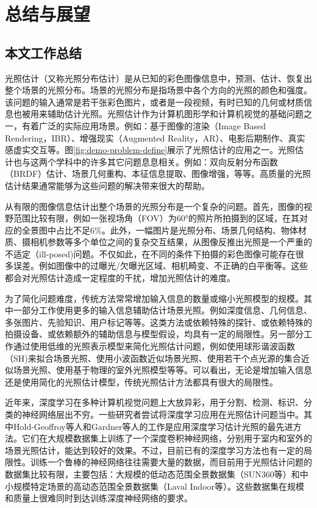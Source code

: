 \chapter{总结与展望}
\section{本文工作总结}
光照估计（又称光照分布估计）是从已知的彩色图像信息中，预测、估计、恢复出整个场景的光照分布。场景的光照分布是指场景中各个方向的光照的颜色和强度。该问题的输入通常是若干张彩色图片，或者是一段视频，有时已知的几何或材质信息也被用来辅助估计光照。光照估计作为计算机图形学和计算机视觉的基础问题之一，有着广泛的实际应用场景。例如：基于图像的渲染（Image Based Rendering，IBR）、增强现实（Augmented Reality，AR）、电影后期制作、真实感虚实交互等。图\ref{fig:demo-problem-define}展示了光照估计的应用之一。光照估计也与这两个学科中的许多其它问题息息相关。例如：双向反射分布函数（BRDF）估计、场景几何重构、本征信息提取、图像增强，等等。高质量的光照估计结果通常能够为这些问题的解决带来很大的帮助。

从有限的图像信息估计出整个场景的光照分布是一个复杂的问题。首先，图像的视野范围比较有限，例如一张视场角（FOV）为60°的照片所拍摄到的区域，在其对应的全景图中占比不足6\%。此外，一幅图片是光照分布、场景几何结构、物体材质、摄相机参数等多个单位之间的复杂交互结果，从图像反推出光照是一个严重的不适定（ill-posed)问题。不仅如此，在不同的条件下拍摄的彩色图像可能存在很多误差。例如图像中的过曝光/欠曝光区域、相机畸变、不正确的白平衡等。这些都会对光照估计造成一定程度的干扰，增加光照估计的难度。

为了简化问题难度，传统方法常常增加输入信息的数量或缩小光照模型的规模。其中一部分工作使用更多的输入信息辅助估计场景光照。例如深度信息、几何信息、多张图片、先验知识、用户标记等等。这类方法或依赖特殊的探针、或依赖特殊的拍摄设备、或依赖额外的辅助信息与模型假设，均具有一定的局限性。另一部分工作通过使用低维的光照表示模型来简化光照估计问题，例如使用球形谐波函数（SH)来拟合场景光照、使用小波函数近似场景光照、使用若干个点光源的集合近似场景光照、使用基于物理的室外光照模型等等。可以看出，无论是增加输入信息还是使用简化的光照估计模型，传统光照估计方法都具有很大的局限性。

近年来，深度学习在多种计算机视觉问题上大放异彩，用于分割、检测、标识、分类的神经网络层出不穷。一些研究者尝试将深度学习应用在光照估计问题当中。其中Hold-Geoffroy等人\cite{hold2017deep}和Gardner\cite{gardner2017learning}等人的工作是应用深度学习估计光照的最先进方法。它们在大规模数据集上训练了一个深度卷积神经网络，分别用于室内和室外的场景光照估计，能达到较好的效果。不过，目前已有的深度学习方法也有一定的局限性。训练一个鲁棒的神经网络往往需要大量的数据，而目前用于光照估计问题的数据集比较有限，主要包括：大规模的低动态范围全景数据集（SUN360\cite{xiao2012recognizing}等）和中小规模特定场景的高动态范围全景数据集（Laval Indoor等\cite{gardner2017learning}）。这些数据集在规模和质量上很难同时到达训练深度神经网络的要求。

